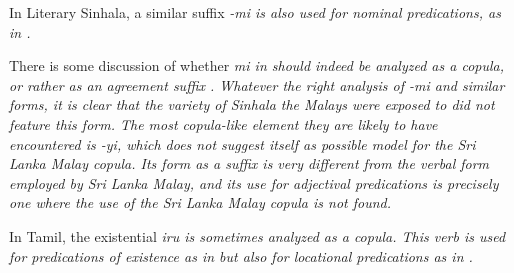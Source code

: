 \documentclass[a4paper,12pt]{article}
\begin{document}




 
In Literary Sinhala, a similar suffix \em -mi \em is also used for nominal predications, as in .



There is some discussion of whether \em mi \em in should indeed be analyzed as a copula, or rather as an agreement suffix \citep[242]{Gair1998}. Whatever the right analysis of \em -mi \em and similar forms, it is clear that the variety of Sinhala the Malays were exposed to did not feature this form. The most copula-like element they are likely to have encountered is \em -yi\em, which does not suggest itself as possible model for the Sri Lanka Malay copula. Its form as a suffix is very different from the verbal form employed by Sri Lanka Malay, and its use for adjectival predications is precisely one where the use of the Sri Lanka Malay copula is not found.

In Tamil, the existential \em iru \em is sometimes analyzed as a copula. This verb is used for predications of existence as in  but also for locational predications as in .


\end{document}
